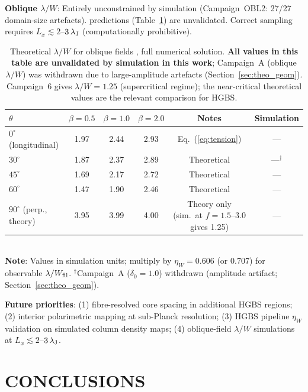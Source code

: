 \documentclass[twoside,twocolumn]{mnras}
\begin{document}
\textbf{Oblique $\lambda/W$}: Entirely unconstrained by simulation (Campaign~OBL2: 27/27 domain-size artefacts). \citet{Nakamura1993} predictions (Table~\ref{tab:oblique_theory}) are unvalidated. Correct sampling requires $L_x \lesssim 2$--$3\,\lambda_{\rm J}$ (computationally prohibitive).

\begin{table}
\caption{Theoretical $\lambda/W$ for oblique fields \citep{Nakamura1993}, full numerical
solution. \textbf{All values in this table are unvalidated by simulation in this work};
Campaign~A (oblique $\lambda/W$) was withdrawn due to large-amplitude artefacts
(Section~\ref{sec:theo_geom}). Campaign~6 gives $\lambda/W=1.25$ (supercritical regime);
the near-critical theoretical values are the relevant comparison for HGBS.}
\label{tab:oblique_theory}
\small
\begin{tabular}{lccccc}
\toprule
$\theta$ & $\beta=0.5$ & $\beta=1.0$ & $\beta=2.0$ & Notes & Simulation \\
\midrule
$0^\circ$ (longitudinal) & 1.97 & 2.44 & 2.93 & Eq.~(\ref{eq:tension}) & --- \\
$30^\circ$ & 1.87 & 2.37 & 2.89 & Theoretical & ---$^\dagger$ \\
$45^\circ$ & 1.69 & 2.17 & 2.72 & Theoretical & --- \\
$60^\circ$ & 1.47 & 1.90 & 2.46 & Theoretical & --- \\
$90^\circ$ (perp., theory) & 3.95 & 3.99 & 4.00 & Theory only (sim.\ at $f=1.5$--$3.0$ gives 1.25) & --- \\
\bottomrule
\end{tabular}
\\ \footnotesize \textbf{Note}: Values in simulation units; multiply by $\eta_W = 0.606$ (or $0.707$) for observable $\lambda/W_{\rm fil}$. $^\dagger$Campaign~A ($\delta_0=1.0$) withdrawn (amplitude artifact; Section~\ref{sec:theo_geom}).
\end{table}

\textbf{Future priorities}: (1) fibre-resolved core spacing in additional HGBS regions; (2) interior polarimetric mapping at sub-Planck resolution; (3) HGBS pipeline $\eta_W$ validation on simulated column density maps; (4) oblique-field $\lambda/W$ simulations at $L_x \lesssim 2$--$3\,\lambda_{\rm J}$.

\section{CONCLUSIONS}
\end{document}
